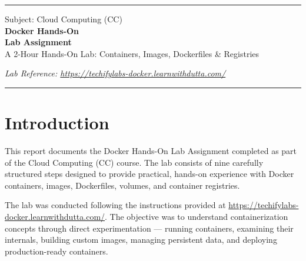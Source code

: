 \documentclass[12pt, a4paper]{article}
\begin{document}
\begin{titlepage}
    \centering
    \vspace*{1cm}

    {\color{primaryblue}\rule{\linewidth}{2pt}}
    \vspace{0.5cm}

    {\large Subject: Cloud Computing (CC)}\\[1.5cm]

    {\Huge\bfseries\color{primaryblue} Docker Hands-On\\Lab Assignment}\\[0.5cm]
    {\large A 2-Hour Hands-On Lab: Containers, Images, Dockerfiles \& Registries}

    \vspace{2cm}


    \vfill

    {\small\textit{Lab Reference: \url{https://techifylabs-docker.learnwithdutta.com/}}}

    \vspace{1cm}
    {\color{primaryblue}\rule{\linewidth}{2pt}}
\end{titlepage}

\tableofcontents
\newpage

\section{Introduction}

This report documents the Docker Hands-On Lab Assignment completed as part of the Cloud Computing (CC) course. The lab consists of nine carefully structured steps designed to provide practical, hands-on experience with Docker containers, images, Dockerfiles, volumes, and container registries.

The lab was conducted following the instructions provided at \url{https://techifylabs-docker.learnwithdutta.com/}. The objective was to understand containerization concepts through direct experimentation --- running containers, examining their internals, building custom images, managing persistent data, and deploying production-ready containers.
\end{document}
